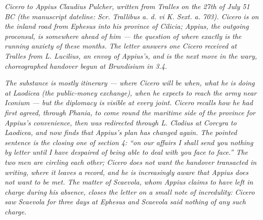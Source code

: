 
\textit{Cicero to Appius Claudius Pulcher, written from
Tralles on the 27th of July 51 BC (the manuscript
dateline: \textit{Scr. Trallibus a. d. vi K. Sext. a.
703}). Cicero is on the inland road from Ephesus into
his province of Cilicia; Appius, the outgoing
proconsul, is somewhere ahead of him --- the question of
where exactly is the running anxiety of these months.
The letter answers one Cicero received at Tralles from
L. Lucilius, an envoy of Appius's, and is the next move
in the wary, choreographed handover begun at
Brundisium in 3.4.}

\textit{The substance is mostly itinerary --- where
Cicero will be when, what he is doing at Laodicea (the
public-money exchange), when he expects to reach the
army near Iconium --- but the diplomacy is visible at
every joint. Cicero recalls how he had first agreed,
through Phania, to come round the maritime side of the
province for Appius's convenience, then was redirected
through L. Clodius at Corcyra to Laodicea, and now
finds that Appius's plan has changed again. The pointed
sentence is the closing one of section 4: ``on our
affairs I shall send you nothing by letter until I have
despaired of being able to deal with you face to
face.'' The two men are circling each other; Cicero
does not want the handover transacted in writing, where
it leaves a record, and he is increasingly aware that
Appius does not want to be met. The matter of Scaevola,
whom Appius claims to have left in charge during his
absence, closes the letter on a small note of
incredulity: Cicero saw Scaevola for three days at
Ephesus and Scaevola said nothing of any such charge.}
